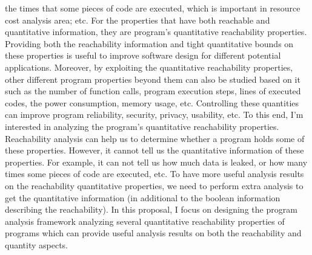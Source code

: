the times that some pieces of code are executed, which is important in resource cost analysis area; etc.
For the properties that have both reachable and quantitative information, they are
program's quantitative reachability properties.
Providing both the reachability information and tight quantitative bounds on 
these properties is useful to improve software design for different potential applications.
Moreover, 
by exploiting the quantitative reachability properties,
other different program properties beyond them can also be 
studied based on it
such as the number of function calls,
program execution steps,
lines of executed codes,
the power consumption, memory usage, etc. 
Controlling
these quantities
can improve program reliability, security, privacy, usability, etc.
To this end, I'm interested in
analyzing the program's quantitative reachability properties.
Reachability analysis can help us to determine whether a program holds some of these properties.
However, it cannot tell us
the quantitative information of these properties.
For example, it can not tell us how much data is leaked, or
how many times some pieces of code are executed, etc.
To have more useful analysis results on the reachability quantitative properties,
we need to perform extra analysis
to get the quantitative information
(in additional to the boolean information describing the reachability).
In this proposal, I focus on designing
the program analysis framework analyzing several quantitative reachability properties of programs
which can provide useful analysis results on both the reachability and quantity aspects.

